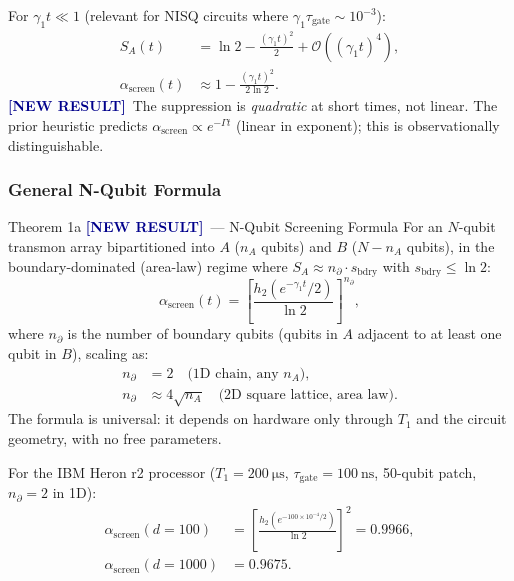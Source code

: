 \documentclass[12pt,a4paper]{article}
\newcommand{\NEW}{\textcolor{darkblue}{\textbf{[NEW RESULT]}}}
\theoremstyle{monette}
\theoremstyle{definition}
\newcommand{\SA}{S_A}
\newcommand{\asc}{\alpha_{\mathrm{screen}}}
\newcommand{\htwo}{h_2}
\newcommand{\tgate}{\tau_{\mathrm{gate}}}
\newcommand{\nprt}{n_{\partial}}
\newcommand{\gamone}{\gamma_1}
\newcommand{\Tone}{T_1}
\begin{document}
For $\gamone t \ll 1$ (relevant for NISQ circuits where $\gamone\tgate \sim 10^{-3}$):
\begin{align}
  \SA(t) &= \ln 2 - \frac{(\gamone t)^2}{2}
    + \mathcal{O}((\gamone t)^4), \label{eq:SA_short}\\
  \asc(t) &\approx 1 - \frac{(\gamone t)^2}{2\ln 2}. \label{eq:alpha_short}
\end{align}
\NEW\ The suppression is \emph{quadratic} at short times, not linear.
The prior heuristic predicts $\asc \propto e^{-\Gamma t}$ (linear in exponent);
this is observationally distinguishable.

\subsubsection{General N-Qubit Formula}

\begin{thmbox}[label=thm:screening]{Theorem 1a \NEW\ --- N-Qubit Screening Formula}
For an $N$-qubit transmon array bipartitioned into $A$ ($n_A$ qubits)
and $B$ ($N-n_A$ qubits), in the boundary-dominated (area-law) regime
where $\SA \approx \nprt \cdot s_{\mathrm{bdry}}$ with $s_{\mathrm{bdry}} \leq \ln 2$:
\begin{equation}
  \boxed{
    \asc(t) = \left[\frac{\htwo\!\left(e^{-\gamone t}/2\right)}{\ln 2}\right]^{\nprt},
  }
  \label{eq:alpha_N}
\end{equation}
where $\nprt$ is the number of boundary qubits (qubits in $A$ adjacent to at
least one qubit in $B$), scaling as:
\begin{align}
  \nprt &= 2 \quad\text{(1D chain, any }n_A\text{)}, \label{eq:nprt_1D}\\
  \nprt &\approx 4\sqrt{n_A} \quad\text{(2D square lattice, area law)}. \label{eq:nprt_2D}
\end{align}
The formula is universal: it depends on hardware only through $\Tone$
and the circuit geometry, with no free parameters.
\end{thmbox}

For the IBM Heron r2 processor ($\Tone = \SI{200}{\micro\second}$,
$\tgate = \SI{100}{\nano\second}$, 50-qubit patch, $\nprt = 2$ in 1D):
\begin{align}
  \asc(d=100) &= \left[\frac{\htwo(e^{-100\times 10^{-4}/2})}{\ln 2}\right]^{2}
    = 0.9966, \label{eq:alpha_heron_100}\\
  \asc(d=1000) &= 0.9675. \label{eq:alpha_heron_1000}
\end{align}
\end{document}
